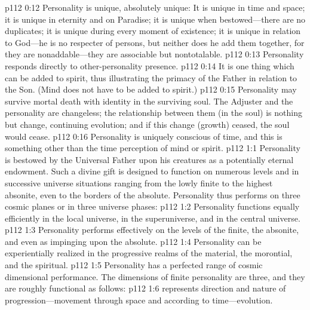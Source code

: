 \pc \vs p112 0:12 \bibnobreakspace Personality is unique, absolutely unique: It is unique in time and space; it is unique in eternity and on Paradise; it is unique when bestowed---there are no duplicates; it is unique during every moment of existence; it is unique in relation to God---he is no respecter of persons, but neither does he add them together, for they are nonaddable---they are associable but nontotalable.\plusone
\pc \vs p112 0:13 \bibnobreakspace Personality responds directly to other\hyp{}personality presence.
\pc \vs p112 0:14 \bibnobreakspace It is one thing which can be added to spirit, thus illustrating the primacy of the Father in relation to the Son. (Mind does not have to be added to spirit.)
\pc \vs p112 0:15 \bibnobreakspace Personality may survive mortal death with identity in the surviving soul. The Adjuster and the personality are changeless; the relationship between them (in the soul) is nothing but change, continuing evolution; and if this change (growth) ceased, the soul would cease.
\pc \vs p112 0:16 \bibnobreakspace Personality is uniquely conscious of time, and this is something other than the time perception of mind or spirit.
\vs p112 1:1 Personality is bestowed by the Universal Father upon his creatures as a potentially eternal endowment. Such a divine gift is designed to function on numerous levels and in successive universe situations ranging from the lowly finite to the highest absonite, even to the borders of the absolute. Personality thus performs on three cosmic planes or in three universe phases:
\pc \vs p112 1:2 \bibnobreakspace {} Personality functions equally efficiently in the local universe, in the superuniverse, and in the central universe.
\pc \vs p112 1:3 \bibnobreakspace {} Personality performs effectively on the levels of the finite, the absonite, and even as impinging upon the absolute.
\pc \vs p112 1:4 \bibnobreakspace {} Personality can be experientially realized in the progressive realms of the material, the morontial, and the spiritual.
\pc \vs p112 1:5 Personality has a perfected range of cosmic dimensional performance. The dimensions of finite personality are three, and they are roughly functional as follows:
\pc \vs p112 1:6 \bibnobreakspace {} represents direction and nature of progression---movement through space and according to time---evolution.
